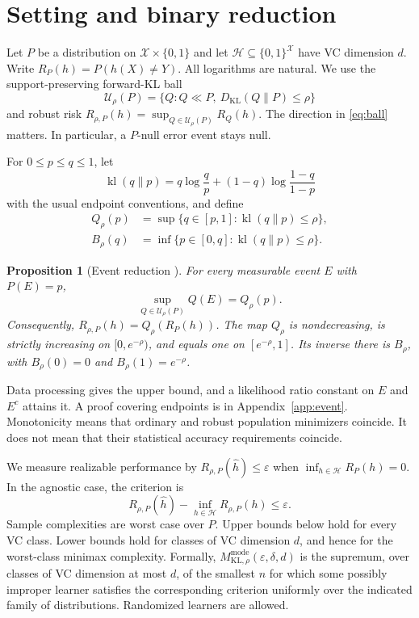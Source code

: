 \documentclass{article}
\newtheorem{proposition}[theorem]{Proposition}
\theoremstyle{remark}
\newcommand{\cH}{\mathcal H}
\newcommand{\cU}{\mathcal U}
\newcommand{\KL}{D_{\mathrm{KL}}}
\newcommand{\kl}{\operatorname{kl}}
\newcommand{\eps}{\varepsilon}
\begin{document}
\section{Setting and binary reduction}
\label{sec:setting}

Let $P$ be a distribution on $\mathcal X\times\{0,1\}$ and let $\cH\subseteq\{0,1\}^{\mathcal X}$ have VC dimension $d$.  Write $R_P(h)=P(h(X)\ne Y)$.  All logarithms are natural.  We use the support-preserving forward-KL ball
\begin{equation}
 \cU_\rho(P)=\{Q:Q\ll P,\ \KL(Q\|P)\le\rho\}
 \label{eq:ball}
\end{equation}
and robust risk $R_{\rho,P}(h)=\sup_{Q\in\cU_\rho(P)}R_Q(h)$.  The direction in \eqref{eq:ball} matters.  In particular, a $P$-null error event stays null.

For $0\le p\le q\le1$, let \[ \kl(q\|p)=q\log\frac qp+(1-q)\log\frac{1-q}{1-p} \] with the usual endpoint conventions, and define
\begin{align}
 Q_\rho(p)&=\sup\{q\in[p,1]:\kl(q\|p)\le\rho\},
 \label{eq:Qdef}\\
 B_\rho(q)&=\inf\{p\in[0,q]:\kl(q\|p)\le\rho\}.
 \label{eq:Bdef}
\end{align}

\begin{proposition}[Event reduction \citealp{huhongso2013ambiguous}]
\label{prop:event}
For every measurable event $E$ with $P(E)=p$, \[ \sup_{Q\in\cU_\rho(P)}Q(E)=Q_\rho(p). \] Consequently, $R_{\rho,P}(h)=Q_\rho(R_P(h))$.  The map $Q_\rho$ is nondecreasing, is strictly increasing on $[0,e^{-\rho})$, and equals one on $[e^{-\rho},1]$.  Its inverse there is $B_\rho$, with $B_\rho(0)=0$ and $B_\rho(1)=e^{-\rho}$.
\end{proposition}

Data processing gives the upper bound, and a likelihood ratio constant on $E$ and $E^c$ attains it.  A proof covering endpoints is in Appendix~\ref{app:event}.  Monotonicity means that ordinary and robust population minimizers coincide.  It does not mean that their statistical accuracy requirements coincide.

We measure realizable performance by $R_{\rho,P}(\widehat h)\le\eps$ when $\inf_{h\in\cH}R_P(h)=0$.  In the agnostic case, the criterion is
\begin{equation}
 R_{\rho,P}(\widehat h)-\inf_{h\in\cH}R_{\rho,P}(h)\le\eps.
 \label{eq:agnostic-criterion}
\end{equation}
Sample complexities are worst case over $P$.  Upper bounds below hold for every VC class.  Lower bounds hold for classes of VC dimension $d$, and hence for the worst-class minimax complexity. Formally, $M^{\mathrm{mode}}_{\mathrm{KL},\rho}(\eps,\delta,d)$ is the supremum, over classes of VC dimension at most $d$, of the smallest $n$ for which some possibly improper learner satisfies the corresponding criterion uniformly over the indicated family of distributions.  Randomized learners are allowed.
\end{document}
